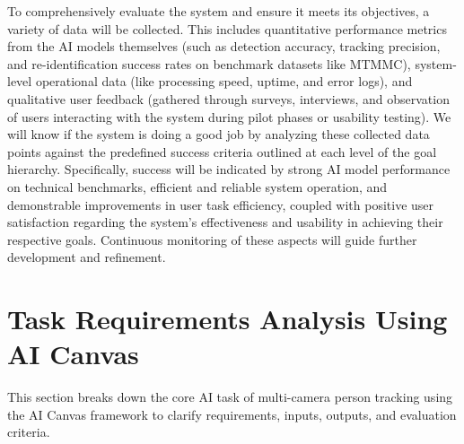 \label{section:goal_hierarchy} %
To comprehensively evaluate the system and ensure it meets its objectives, a variety of data will be collected. This includes quantitative performance metrics from the AI models themselves (such as detection accuracy, tracking precision, and re-identification success rates on benchmark datasets like MTMMC), system-level operational data (like processing speed, uptime, and error logs), and qualitative user feedback (gathered through surveys, interviews, and observation of users interacting with the system during pilot phases or usability testing). We will know if the system is doing a good job by analyzing these collected data points against the predefined success criteria outlined at each level of the goal hierarchy. Specifically, success will be indicated by strong AI model performance on technical benchmarks, efficient and reliable system operation, and demonstrable improvements in user task efficiency, coupled with positive user satisfaction regarding the system's effectiveness and usability in achieving their respective goals. Continuous monitoring of these aspects will guide further development and refinement.

\section{Task Requirements Analysis Using AI Canvas}
\label{section:task_analysis} %
This section breaks down the core AI task of multi-camera person tracking using the AI Canvas framework to clarify requirements, inputs, outputs, and evaluation criteria.

